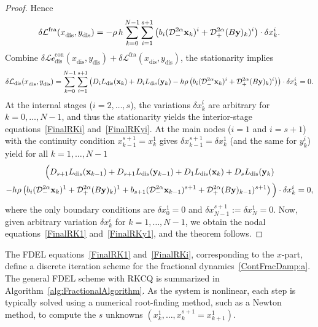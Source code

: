 \documentclass[a4paper,10pt,reqno]{amsart}
\theoremstyle{definition}
\newcommand{\lp}{\left(}
\newcommand{\rp}{\right)}
\newcommand{\Lc}{\mathcal{Lc}^{\text{con}}}
\newcommand{\Lf}{\mathcal{L}^{\text{fra}}}
\newcommand{\dis}{\text{dis}}
\begin{document}
\begin{proof}
{Hence
\[\delta\Lf(x_\dis^{},y_\dis^{})=-\rho\,h\sum_{k=0}^{N-1}\sum_{i=1}^{s+1}\left(b_i(\mathcal{D}^{2\alpha}_{-}{\bf x}_k)^i +\mathcal{D}^{2\alpha}_{+}(B{\bf  y})_k)^i\right)\cdot \delta  x_k^i.\]
Combine $\delta\Lc_\dis(x_\dis^{},y_\dis^{})+\delta\Lf(x_\dis^{},y_\dis^{})$, the stationarity implies
\[\delta\mathcal{L}_\dis(x_\dis^{},y_\dis^{})=\sum_{k=0}^{N-1}\sum_{i=1}^{s+1}\lp D_iL_\dis(\mathbf x_k)+D_iL_\dis(\mathbf  y_k)-h\rho\left(b_i(\mathcal{D}^{2\alpha}_{-}{\bf x}_k)^i +\mathcal{D}^{2\alpha}_{+}(B{\bf  y})_k)^i\right)\rp\cdot \delta  x_k^i=0.\]
At the internal stages ($i=2,\ldots,s$),  the variations $\delta x_k^i$  are arbitrary for $k=0,\ldots,N-1$, and thus the stationarity yields the interior-stage equations~\eqref{FinalRKi} and~\eqref{FinalRKyi}.
At the main nodes ($i=1$ and $i=s+1$) with the continuity condition $ x_{k-1}^{s+1}= x_{k}^{1}$ gives $\delta x_{k-1}^{s+1}=\delta x_{k}^{1}$ (and the same for $y_k^i$) yield for all $k=1,\ldots,N-1$
\begin{multline*}
   \Big( D_{s+1}L_\dis(\mathbf  x_{k-1})+D_{s+1}L_\dis(\mathbf  y_{k-1})+ D_{1}L_\dis(\mathbf  x_{k})+D_{s}L_\dis(\mathbf  y_{k})\\-h\rho\left(b_i(\mathcal{D}^{2\alpha}_{-}{\bf x}_k)^1 +\mathcal{D}^{2\alpha}_{+}(B{\bf  y})_k)^1+b_{s+1}(\mathcal{D}^{2\alpha}_{-}{\bf x}_{k-1})^{s+1} +\mathcal{D}^{2\alpha}_{+}(B{\bf  y})_{k-1})^{s+1}\right)\Big)\cdot \delta  x_k^i=0,
\end{multline*}
where the only boundary conditions are $\delta x_0^1=0$ and $\delta x_{N-1}^{s+1}:=\delta x_{N}^{1}=0$. Now, given arbitrary  variation $\delta x_k^{i}$ for $k=1,\ldots,N-1$, we obtain the nodal equations~\eqref{FinalRK1} and~\eqref{FinalRKy1},  and the theorem follows.}
\end{proof}

The FDEL equations~\eqref{FinalRK1} and~\eqref{FinalRKi}, corresponding to the $x$-part, define a discrete iteration scheme for the fractional dynamics~\eqref{ContFracDamp:a}. The general FDEL scheme with RKCQ is summarized in Algorithm~\ref{alg:FractionalAlgorithm}. As the system is nonlinear, each step is typically solved using a numerical root-finding method, such as a Newton method, to compute the $s$ unknowns $(x_k^1,\ldots,x_k^{s+1}=x_{k+1}^1)$. %
\end{document}
